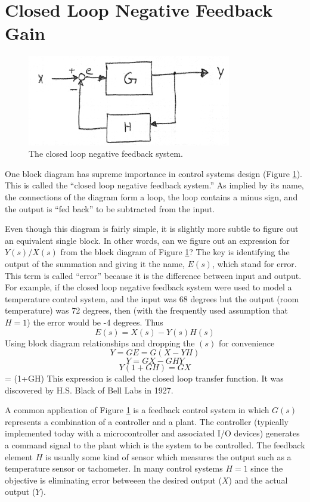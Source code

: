 \section{Closed Loop Negative Feedback Gain}

\begin{figure}\centering
\includegraphics[width=3.5in]{figs06/00769a.png}
\caption{The closed loop negative feedback system.}\label{closedloopnegfeedbackblockdiag}
\end{figure}

One block diagram has supreme importance in control systems design (Figure \ref{closedloopnegfeedbackblockdiag}).  This is called the ``closed loop negative feedback system.''   As implied by its name, the connections of the diagram form a loop, the loop contains a minus sign, and the output is ``fed back'' to be subtracted from the input.

Even though this diagram is fairly simple, it is slightly more subtle to figure out an equivalent single block.  In other words, can we figure out an expression for $Y(s)/X(s)$ from the block diagram of Figure \ref{closedloopnegfeedbackblockdiag}?
The key is identifying the output of the summation and giving it the name, $E(s)$, which stand for error.  This term is called ``error'' because it is the difference between input and output.  For example, if the closed loop negative feedback system were used to model a temperature control system, and the input was 68 degrees but the output (room temperature) was 72 degrees, then (with the frequently used assumption that $H=1$) the error would be -4 degrees.  Thus
\[
E(s) = X(s)-Y(s)H(s)
\]
Using block diagram relationships and dropping the $(s)$ for convenience
\[
Y = GE = G(X-YH)
\]
\[
Y = GX-GHY
\]
\[
Y(1+GH) = GX
\]
\bq\label{hsblackeqn}
 =  {(1+GH)}
\eq
This expression is called the closed loop transfer function.  It was discovered by H.S. Black of Bell Labs in 1927.

A common application of Figure \ref{closedloopnegfeedbackblockdiag} is a feedback control system in which $G(s)$ represents a combination of a controller and a plant.  The controller (typically implemented today with a microcontroller and associated I/O devices) generates a command signal to the plant which is the system to be controlled.  The feedback element $H$ is usually some kind of sensor which measures the output such as a temperature sensor or tachometer.  In many control systems $H=1$ since the objective is eliminating error betweeen the desired output ($X$) and the actual output ($Y$).


